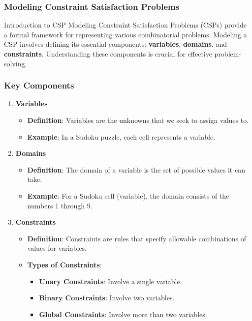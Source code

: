 \documentclass[aspectratio=169]{beamer}
\begin{document}
\begin{frame}[fragile]
    \frametitle{Modeling Constraint Satisfaction Problems}
    \begin{block}{Introduction to CSP Modeling}
        Constraint Satisfaction Problems (CSPs) provide a formal framework for representing various combinatorial problems. 
        Modeling a CSP involves defining its essential components: \textbf{variables}, \textbf{domains}, and \textbf{constraints}.
        Understanding these components is crucial for effective problem-solving.
    \end{block}
\end{frame}

\begin{frame}[fragile]
    \frametitle{Key Components}
    \begin{enumerate}
        \item \textbf{Variables}
            \begin{itemize}
                \item \textbf{Definition}: Variables are the unknowns that we seek to assign values to.
                \item \textbf{Example}: In a Sudoku puzzle, each cell represents a variable.
            \end{itemize}
        \item \textbf{Domains}
            \begin{itemize}
                \item \textbf{Definition}: The domain of a variable is the set of possible values it can take.
                \item \textbf{Example}: For a Sudoku cell (variable), the domain consists of the numbers 1 through 9.
            \end{itemize}
        \item \textbf{Constraints}
            \begin{itemize}
                \item \textbf{Definition}: Constraints are rules that specify allowable combinations of values for variables.
                \item \textbf{Types of Constraints}:
                    \begin{itemize}
                        \item \textbf{Unary Constraints}: Involve a single variable. 
                        \item \textbf{Binary Constraints}: Involve two variables.
                        \item \textbf{Global Constraints}: Involve more than two variables.
                    \end{itemize}
            \end{itemize}
    \end{enumerate}
\end{frame}
\end{document}
